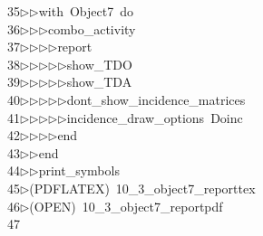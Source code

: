 \begin{tabbing}
35\>$\triangleright$\>$\triangleright$\>with\ Object7\ do\ \\[0pt]
36\>$\triangleright$\>$\triangleright$\>$\triangleright$\>combo\_activity\ \\[0pt]
37\>$\triangleright$\>$\triangleright$\>$\triangleright$\>$\triangleright$\>report\ \\[0pt]
38\>$\triangleright$\>$\triangleright$\>$\triangleright$\>$\triangleright$\>$\triangleright$\>show\_TDO\ \\[0pt]
39\>$\triangleright$\>$\triangleright$\>$\triangleright$\>$\triangleright$\>$\triangleright$\>show\_TDA\ \\[0pt]
40\>$\triangleright$\>$\triangleright$\>$\triangleright$\>$\triangleright$\>$\triangleright$\>dont\_show\_incidence\_matrices\ \\[0pt]
41\>$\triangleright$\>$\triangleright$\>$\triangleright$\>$\triangleright$\>$\triangleright$\>incidence\_draw\_options\ Doinc\ \\[0pt]
42\>$\triangleright$\>$\triangleright$\>$\triangleright$\>$\triangleright$\>end\ \\[0pt]
43\>$\triangleright$\>$\triangleright$\>end\ \\[0pt]
44\>$\triangleright$\>$\triangleright$\>print\_symbols\\[0pt]
45\>$\triangleright$\>(PDFLATEX)\ 10\_3\_object7\_reporttex\\[0pt]
46\>$\triangleright$\>(OPEN)\ 10\_3\_object7\_reportpdf\\[0pt]
47\>\end{tabbing}
